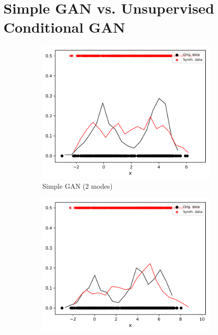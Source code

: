 \documentclass{article} %
\begin{document}
\section{Simple GAN vs. Unsupervised Conditional GAN}
\begin{figure}[h]
	\centering
	\captionsetup{labelformat=empty}
	\begin{subfigure}[b]{0.3\textwidth}
		\includegraphics[width=\textwidth]{2_gan_ls9_1000_1000.pdf}
		\caption{Simple GAN (2 modes)}
		\label{fig:gan_2}
	\end{subfigure}
	\begin{subfigure}[b]{0.3\textwidth}
		\includegraphics[width=\textwidth]{3_gan_ls9_1000_1000.pdf}

\end{subfigure}
\end{figure}
\end{document}
